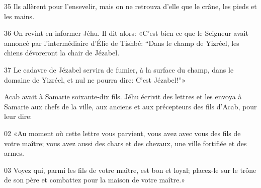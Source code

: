 
35 Ils allèrent pour l’ensevelir, mais on ne retrouva d’elle que le crâne, les pieds et les mains.

36 On revint en informer Jéhu. Il dit alors: «C’est bien ce que le Seigneur avait annoncé par l’intermédiaire d’Élie de Tishbé: “Dans le champ de Yizréel, les chiens dévoreront la chair de Jézabel.

37 Le cadavre de Jézabel servira de fumier, à la surface du champ, dans le domaine de Yizréel, et nul ne pourra dire: C’est Jézabel!”»

Acab avait à Samarie soixante-dix fils. Jéhu écrivit des lettres et les envoya à Samarie aux chefs de la ville, aux anciens et aux précepteurs des fils d’Acab, pour leur dire:

02 «Au moment où cette lettre vous parvient, vous avez avec vous des fils de votre maître; vous avez aussi des chars et des chevaux, une ville fortifiée et des armes.

03 Voyez qui, parmi les fils de votre maître, est bon et loyal; placez-le sur le trône de son père et combattez pour la maison de votre maître.»